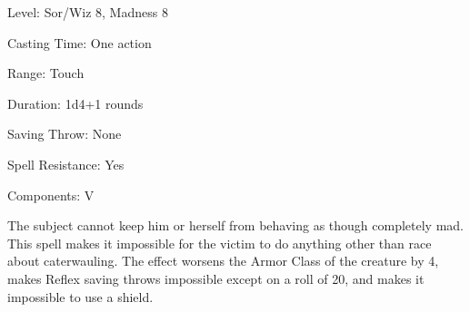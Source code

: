 
\begin{description*}
\item[Level:] Sor/Wiz 8, Madness 8
\item[Casting Time:] One action
\item[Range:] Touch
\item[Duration:] 1d4+1 rounds
\item[Saving Throw:] None
\item[Spell Resistance:] Yes
\item[Components:] V
\end{description*}

The subject cannot keep him or herself from behaving as though completely mad.
This spell makes it impossible for the victim to do anything other than race about
caterwauling.
The effect worsens the Armor Class of the creature by 4, makes Reflex saving throws
impossible except on a roll of 20, and makes it impossible to use a shield.